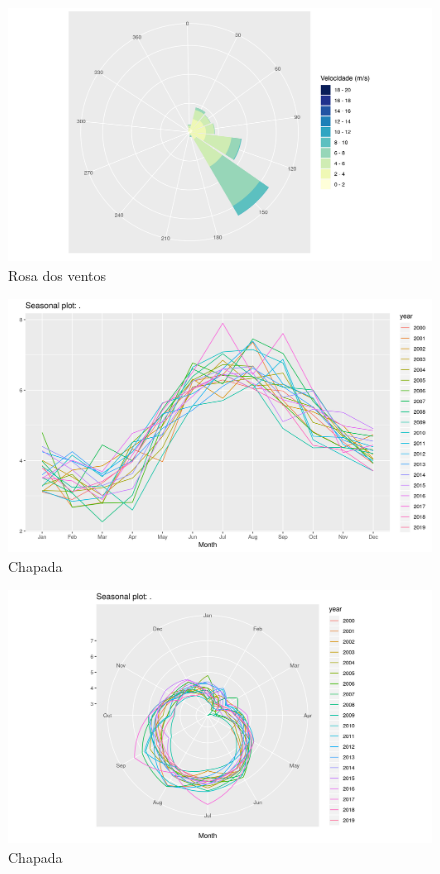 \documentclass[
	12pt,				%
	openright,			%
	oneside,			%
	a4paper,			%
	english,			%
	french,				%
	spanish,			%
	brazil				%
	]{abntex2}
\begin{document}
\begin{figure}[h]
    \centering
	\includegraphics[width=\textwidth]{windrose}
	\caption{Rosa dos ventos}
	\label{fig:windrose}
\end{figure}
\FloatBarrier

\begin{figure}[h]
    \centering
	\includegraphics[width=\textwidth]{season_plot}
	\caption{Chapada}
\end{figure}
\FloatBarrier

\begin{figure}[h]
    \centering
	\includegraphics[width=\textwidth]{season_plot_polar}
	\caption{Chapada}
\end{figure}
\FloatBarrier
\end{document}
